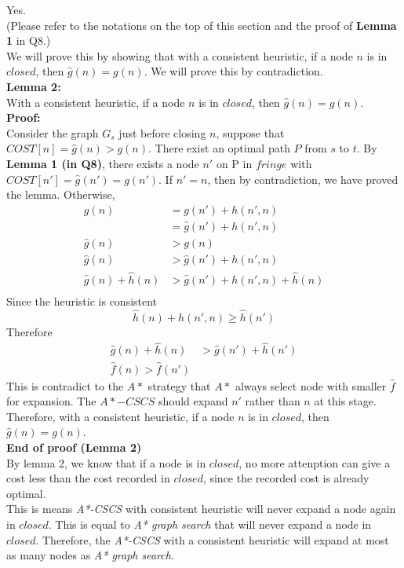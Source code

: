 \documentclass[10.5pt]{article}
\begin{document}
Yes.\\
(Please refer to the notations on the top of this section and the proof of \textbf{Lemma 1} in Q8.)\\
We will prove this by showing that with a consistent heuristic, if a node \(n\) is in $closed$, then \(\hat g(n) = g(n)\). We will prove this by contradiction.\\
\textbf{Lemma 2:}\\
With a consistent heuristic, if a node \(n\) is in $closed$, then \(\hat g(n) = g(n)\).\\
\textbf{Proof:}\\
Consider the graph \(G_s\) just before closing \(n\), suppose that \(COST[n] = \hat g(n) > g(n)\). There exist an optimal path \(P\) from \(s\) to \(t\). By \textbf{Lemma 1 (in Q8)}, there exists a node \(n'\) on P in \(fringe\) with \(COST[n'] = \hat g(n') = g(n')\). If \(n' = n\), then by contradiction, we have proved the lemma. Otherwise,
\begin{align*}
	g(n)                  & = g(n') + h(n', n)                  \\
	                      & = \hat g(n') + h(n', n)             \\
	\hat g(n)             & > g(n)                              \\
	\hat g(n)             & > \hat g(n') + h(n', n)             \\
	\hat g(n) + \hat h(n) & > \hat g(n') + h(n', n) + \hat h(n) \\
\end{align*}
Since the heuristic is consistent
$$
	\hat h(n) + h(n', n) \ge \hat h(n')
$$
Therefore
\begin{align*}
	\hat g(n) + \hat h(n) & > \hat g(n') + \hat h(n') \\
	\hat f(n) > \hat f(n')
\end{align*}
This is contradict to the \(A*\) strategy that \(A*\) always select node with smaller \(\hat f\) for expansion. The \(A*-CSCS\) should expand \(n'\) rather than \(n\) at this stage.\\
Therefore, with a consistent heuristic, if a node \(n\) is in $closed$, then \(\hat g(n) = g(n)\).\\
\textbf{End of proof (Lemma 2)}\\
By lemma 2, we know that if a node is in \(closed\), no more attenption can give a cost less than the cost recorded in \(closed\), since the recorded cost is already optimal.\\
This is means \textit{A*-CSCS} with consistent heuristic will never expand a node again in \(closed\). This is equal to \textit{A* graph search} that will never expand a node in \(closed\). Therefore, the \textit{A*-CSCS} with a consistent heuristic will expand at most as many nodes as \textit{A* graph search}.
\pagebreak
\end{document}
